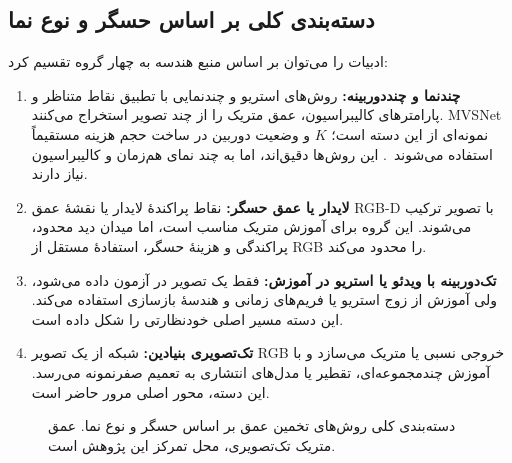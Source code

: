 \subsection{دسته‌بندی کلی بر اساس حسگر و نوع نما}
ادبیات را می‌توان بر اساس منبع هندسه به چهار گروه تقسیم کرد:
\begin{enumerate}
 \item \textbf{چندنما و چنددوربینه:} روش‌های استریو و چندنمایی با تطبیق نقاط متناظر و پارامترهای کالیبراسیون، عمق متریک را از چند تصویر استخراج می‌کنند. MVSNet نمونه‌ای از این دسته است؛ $K$ و وضعیت دوربین در ساخت حجم هزینه مستقیماً استفاده می‌شوند~\cite{Yao2018MVSNet}. این روش‌ها دقیق‌اند، اما به چند نمای هم‌زمان و کالیبراسیون نیاز دارند.
 \item \textbf{لایدار یا عمق حسگر:} نقاط پراکندهٔ لایدار یا نقشهٔ عمق RGB-D با تصویر ترکیب می‌شوند. این گروه برای آموزش متریک مناسب است، اما میدان دید محدود، پراکندگی و هزینهٔ حسگر، استفادهٔ مستقل از RGB را محدود می‌کند.
 \item \textbf{تک‌دوربینه با ویدئو یا استریو در آموزش:} فقط یک تصویر در آزمون داده می‌شود، ولی آموزش از زوج استریو یا فریم‌های زمانی و هندسهٔ بازسازی استفاده می‌کند. این دسته مسیر اصلی خودنظارتی را شکل داده است.
 \item \textbf{تک‌تصویری بنیادین:} شبکه از یک تصویر RGB خروجی نسبی یا متریک می‌سازد و با آموزش چندمجموعه‌ای، تقطیر یا مدل‌های انتشاری به تعمیم صفرنمونه می‌رسد. این دسته، محور اصلی مرور حاضر است.
\end{enumerate}

\begin{figure}[htbp]
\centering
{}
\caption[دسته‌بندی ادبیات بر اساس منبع هندسه]{دسته‌بندی کلی روش‌های تخمین عمق بر اساس حسگر و نوع نما. عمق متریک تک‌تصویری، محل تمرکز این پژوهش است.}
\label{fig:ch2_taxonomy}
\end{figure}

